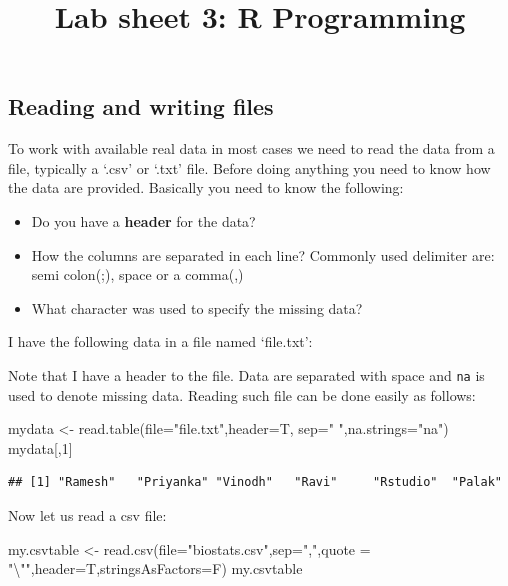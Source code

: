 \documentclass[
]{article}
\title{Lab sheet 3: R Programming}
\author{}
\date{\vspace{-2.5em}}
\newenvironment{Shaded}{\begin{snugshade}}{\end{snugshade}}
\newcommand{\AttributeTok}[1]{\textcolor[rgb]{0.77,0.63,0.00}{#1}}
\newcommand{\DecValTok}[1]{\textcolor[rgb]{0.00,0.00,0.81}{#1}}
\newcommand{\FunctionTok}[1]{\textcolor[rgb]{0.00,0.00,0.00}{#1}}
\newcommand{\NormalTok}[1]{#1}
\newcommand{\OtherTok}[1]{\textcolor[rgb]{0.56,0.35,0.01}{#1}}
\newcommand{\SpecialCharTok}[1]{\textcolor[rgb]{0.00,0.00,0.00}{#1}}
\newcommand{\StringTok}[1]{\textcolor[rgb]{0.31,0.60,0.02}{#1}}
\theoremstyle{remark}
\begin{document}
\maketitle

\hypertarget{reading-and-writing-files}{%
\subsection{Reading and writing files}\label{reading-and-writing-files}}

To work with available real data in most cases we need to read the data
from a file, typically a `.csv' or `.txt' file. Before doing anything
you need to know how the data are provided. Basically you need to know
the following:

\begin{itemize}
    \item  Do you have a \textbf{header} for the data? 
    \item How the columns are separated in each line? Commonly used delimiter are: semi colon(;), space or a comma(,)
    \item What character was used to specify the missing data?
\end{itemize}

I have the following data in a file named `file.txt':



Note that I have a header to the file. Data are separated with space and
\texttt{na} is used to denote missing data. Reading such file can be
done easily as follows:

\begin{Shaded}
\begin{Highlighting}[]
\NormalTok{mydata }\OtherTok{\textless{}{-}} \FunctionTok{read.table}\NormalTok{(}\AttributeTok{file=}\StringTok{"file.txt"}\NormalTok{,}\AttributeTok{header=}\NormalTok{T, }\AttributeTok{sep=}\StringTok{" "}\NormalTok{,}\AttributeTok{na.strings=}\StringTok{"na"}\NormalTok{)}
\NormalTok{mydata[,}\DecValTok{1}\NormalTok{]}
\end{Highlighting}
\end{Shaded}

\begin{verbatim}
## [1] "Ramesh"   "Priyanka" "Vinodh"   "Ravi"     "Rstudio"  "Palak"
\end{verbatim}

Now let us read a csv file:

\begin{Shaded}
\begin{Highlighting}[]
\NormalTok{my.csvtable }\OtherTok{\textless{}{-}} \FunctionTok{read.csv}\NormalTok{(}\AttributeTok{file=}\StringTok{"biostats.csv"}\NormalTok{,}\AttributeTok{sep=}\StringTok{","}\NormalTok{,}\AttributeTok{quote =} \StringTok{"}\SpecialCharTok{\textbackslash{}"}\StringTok{"}\NormalTok{,}\AttributeTok{header=}\NormalTok{T,}\AttributeTok{stringsAsFactors=}\NormalTok{F)}
\NormalTok{my.csvtable}
\end{Highlighting}
\end{Shaded}
\end{document}
